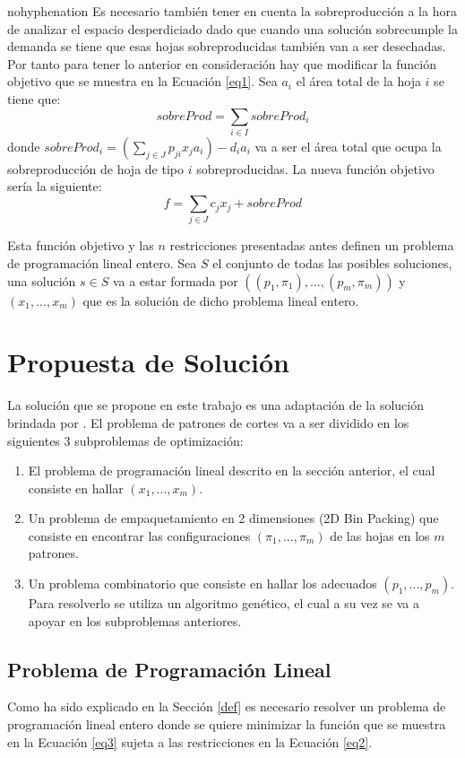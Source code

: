 \documentclass[a4paper,10pt,twocolumn]{article}
\begin{document}
\begin{hyphenrules}{nohyphenation}
Es necesario también tener en cuenta la sobreproducción a la hora de analizar el espacio desperdiciado dado que cuando una solución sobrecumple la demanda se tiene que esas hojas sobreproducidas también van a ser desechadas. Por tanto para tener lo anterior en consideración hay que modificar la función objetivo que se muestra en la Ecuación \eqref{eq1}. Sea $a_i$ el área total de la hoja $i$ se tiene que:
 $$sobreProd = \sum_{i \in I} sobreProd_i $$ 
donde $sobreProd_i = (\sum_{j \in J} p_{ji}x_ja_i)  -  d_ia_i$ va a ser el área total que ocupa la sobreproducción de hoja de tipo $i$ sobreproducidas.
La nueva función objetivo sería la siguiente:
\begin{equation}
f = \sum_{j \in J}c_j x_j + sobreProd
\label{eq3}
\end{equation}

Esta función objetivo y las $n$ restricciones presentadas antes definen un problema de programación lineal entero. Sea $S$ el conjunto de todas las posibles soluciones, una solución $s \in S$ va a estar formada por $((p_1,\pi_1),...,(p_m,\pi_m))$ y $(x_1,...,x_m)$ que es la solución de dicho problema lineal entero.


\section{Propuesta de Solución}\label{prop}
La solución que se propone en este trabajo es una adaptación de la solución brindada por \cite{4}. El problema de patrones de cortes va a ser dividido en los siguientes 3 subproblemas de optimización:
\begin{enumerate}
	\item El problema de programación lineal descrito en la sección anterior, el cual consiste en hallar $(x_1,...,x_m)$.
	\item Un problema de empaquetamiento en 2 dimensiones (2D Bin Packing) que consiste en encontrar las configuraciones $(\pi_1,...,\pi_m)$ de las hojas en los $m$ patrones.
	\item Un problema combinatorio que consiste en hallar los adecuados $(p_1,...,p_m)$. Para resolverlo se utiliza un algoritmo genético, el cual a su vez se va a apoyar en los subproblemas anteriores. 
\end{enumerate}

\subsection{Problema de Programación Lineal}
Como ha sido explicado en la Sección \ref{def} es necesario resolver un problema de programación lineal entero donde se quiere minimizar la función que se muestra en la Ecuación \eqref{eq3} sujeta a las restricciones en la Ecuación \eqref{eq2}.


\end{hyphenrules}
\end{document}
